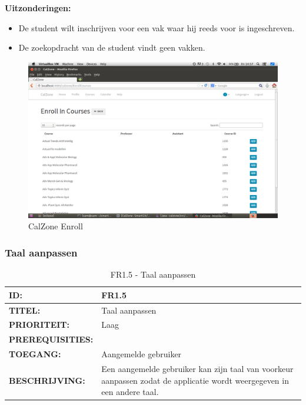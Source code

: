 \textbf{Uitzonderingen:}
\begin{itemize}
\item De student wilt inschrijven voor een vak waar hij reeds voor is ingeschreven.
\item De zoekopdracht van de student vindt geen vakken.

\end{itemize}

\begin{center}
\begin{figure}[H]
\caption{CalZone Enroll}
\centerline{\includegraphics[scale=0.4]{img/CalzoneEnroll}}
\label{fig:CalZone Enroll}
\end{figure}
\end{center}

\subsubsection{Taal aanpassen}
\noindent\begin{table}[H]
            \begin{tabular}{l | p{10cm}}
                \textbf{ID:} & FR1.5 \\ \hline
                \textbf{TITEL:} & Taal aanpassen\\ \hline
                \textbf{PRIORITEIT:} &  Laag \\ \hline
                \textbf{PREREQUISITIES:} & \\ \hline
                \textbf{TOEGANG:} &  Aangemelde gebruiker \\ \hline
                \textbf{BESCHRIJVING:} & Een aangemelde gebruiker kan zijn taal van voorkeur aanpassen zodat de applicatie wordt weergegeven in een andere taal.\\
            \end{tabular}\\
            \caption{FR1.5 - Taal aanpassen}
            \label{tab:FR1.5 - Taal aanpassen}
        \end{table}
        
